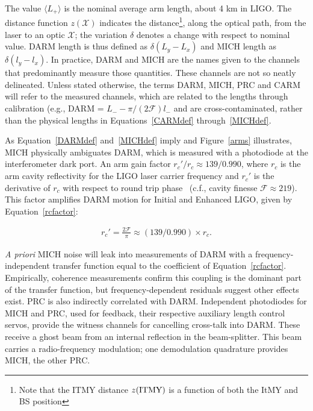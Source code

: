
        The value $\langle L_+\rangle$ is the nominal average arm length, about 4 km in LIGO. The distance function $z(\mathcal{X})$ indicates the distance\footnote{Note that the ITMY distance $z(\textup{ITMY})$ is a function of both the ItMY and BS position}, along the optical path, from the laser to an optic $\mathcal{X}$; the variation $\delta$ denotes a change with respect to nominal value. DARM length is thus defined as $\delta(L_y - L_x)$ and MICH length as $\delta(l_y - l_x)$. In practice, DARM and MICH are the names given to the channels that predominantly measure those quantities. These channels are not so neatly delineated. Unless stated otherwise, the terms DARM, MICH, PRC and CARM will refer to the measured channels, which are related to the lengths through calibration (e.g., DARM = $L_{-} - \pi/(2 \mathcal{F}) l_{-}$ and are cross-contaminated, rather than the physical lengths in Equations~\ref{CARMdef} through~\ref{MICHdef}. 

        As Equation~\ref{DARMdef} and~\ref{MICHdef} imply and Figure~\ref{arms} illustrates, MICH physically ambiguates DARM, which is measured with a photodiode at the interferometer dark port. An arm gain factor $r_{c}'/r_c \approx 139/0.990$, where $r_c$ is the arm cavity reflectivity for the LIGO laser carrier frequency and $r_{c}'$ is the derivative of $r_c$ with respect to round trip phase~\cite{ReadoutGWA,BallmerThesis} (c.f., cavity finesse $\mathcal{F} \approx 219$). This factor amplifies DARM motion for Initial and Enhanced LIGO, given by Equation~\ref{rcfactor}:

        \begin{eqnarray}
        r_{c}' = \frac{2 \mathcal{F}}{\pi} \approx (139/0.990)\times r_c. \label{rcfactor}
        \end{eqnarray}

        \textit{A priori} MICH noise will leak into measurements of DARM with a frequency-independent transfer function equal to the coefficient of Equation~\ref{rcfactor}. Empirically, coherence measurements confirm this coupling is the dominant part of the transfer function, but frequency-dependent residuals suggest other effects exist. PRC is also indirectly correlated with DARM. Independent photodiodes for MICH and PRC, used for feedback, their respective auxiliary length control servos, provide the witness channels for cancelling cross-talk into DARM. These receive a ghost beam from an internal reflection in the beam-splitter. This beam carries a radio-frequency modulation; one demodulation quadrature provides MICH, the other PRC.

